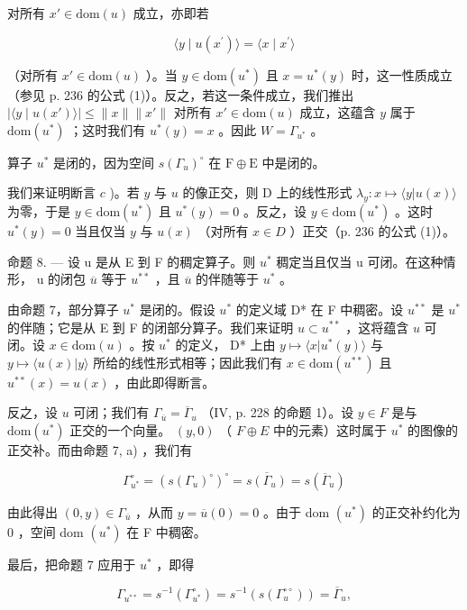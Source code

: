 对所有 \(x' \in \mathrm{dom}(u)\) 成立，亦即若

\[
\langle y \mid u (x ^ {\prime}) \rangle = \langle x \mid x ^ {\prime} \rangle
\]

（对所有 \(x' \in \text{dom}(u)\) ）。当 \(y \in \text{dom}(u^{*})\) 且 \(x = u^{*}(y)\) 时，这一性质成立（参见 p. 236 的公式 (1)）。反之，若这一条件成立，我们推出 \(|\langle y \mid u(x') \rangle| \leqslant \|x\| \|x'\|\) 对所有 \(x' \in \text{dom}(u)\) 成立，这蕴含 \(y\) 属于 \(\text{dom}(u^*)\) ；这时我们有 \(u^*(y) = x\) 。因此 \(W = \Gamma_{u^*}\) 。

算子 \(u^{*}\) 是闭的，因为空间 \(s(\Gamma_{u})^{\circ}\) 在 \(\mathrm{F} \oplus \mathrm{E}\) 中是闭的。

我们来证明断言 \(c\) )。若 \(y\) 与 \(u\) 的像正交，则 D 上的线性形式 \(\lambda_y: x \mapsto \langle y | u(x) \rangle\) 为零，于是 \(y \in \text{dom}(u^*)\) 且 \(u^*(y) = 0\) 。反之，设 \(y \in \text{dom}(u^*)\) 。这时 \(u^*(y) = 0\) 当且仅当 \(y\) 与 \(u(x)\) （对所有 \(x \in D\) ）正交（p. 236 的公式 (1)）。

命题 8. --- 设 u 是从 E 到 F 的稠定算子。则 \(u^{*}\) 稠定当且仅当 u 可闭。在这种情形， u 的闭包 \(\overline{u}\) 等于 \(u^{**}\) ，且 \(\overline{u}\) 的伴随等于 \(u^{*}\) 。

由命题 7，部分算子 \(u^*\) 是闭的。假设 \(u^*\) 的定义域 D* 在 F 中稠密。设 \(u^{**}\) 是 \(u^*\) 的伴随；它是从 E 到 F 的闭部分算子。我们来证明 \(u \subset u^{**}\) ，这将蕴含 \(u\) 可闭。设 \(x \in \text{dom}(u)\) 。按 \(u^*\) 的定义， D* 上由 \(y \mapsto \langle x | u^*(y) \rangle\) 与 \(y \mapsto \langle u(x) | y \rangle\) 所给的线性形式相等；因此我们有 \(x \in \text{dom}(u^{**})\) 且 \(u^{**}(x) = u(x)\) ，由此即得断言。

反之，设 \(u\) 可闭；我们有 \(\Gamma_{\overline{u}} = \overline{\Gamma}_u\) （IV, p. 228 的命题 1）。设 \(y \in F\) 是与 \(\mathrm{dom}(u^*)\) 正交的一个向量。 \((y,0)\) （ \(F \oplus E\) 中的元素）这时属于 \(u^*\) 的图像的正交补。而由命题 7, a) ，我们有

\[
\Gamma_ {u ^ {*}} ^ {\circ} = (s (\Gamma_ {u}) ^ {\circ}) ^ {\circ} = \overline {{s (\Gamma_ {u})}} = s (\overline {{\Gamma}} _ {u})
\]

由此得出 \((0,y)\in\Gamma_{\overline{u}}\) ，从而 \(y=\overline{u}(0)=0\) 。由于 dom \((u^{*})\) 的正交补约化为 0 ，空间 dom \((u^{*})\) 在 F 中稠密。

最后，把命题 7 应用于 \(u^{*}\) ，即得

\[
\Gamma_ {u ^ {* *}} = s ^ {- 1} (\Gamma_ {u ^ {*}} ^ {\circ}) = s ^ {- 1} (s (\Gamma_ {u} ^ {\circ \circ})) = \overline {{\Gamma}} _ {u},
\]

